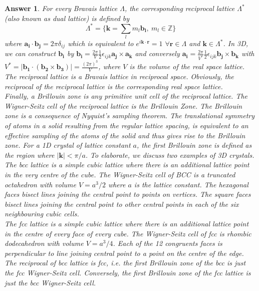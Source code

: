 \documentclass[a4paper]{article}
\newtheorem{ans}{Answer}[subsection]
\theoremstyle{new}
\begin{document}
\begin{ans}
For every Bravais lattice $\Lambda$, the  corresponding reciprocal lattice $\Lambda^*$ (also known as dual lattice) is defined by
$$\Lambda^*=\bigg\{\mathbf{k}=\sum_lm_l\mathbf{b_l},~m_l\in\mathbb{Z}\bigg\}$$
where $\mathbf{a_i}\cdot\mathbf{b_j}=2\pi\delta_{ij}$ which is equivalent to $e^{i\mathbf{k}\cdot\mathbf{r}}=1$ $\forall\mathbf{r}\in\Lambda$ and $\mathbf{k}\in\Lambda^*$. In 3D, we can construct $\mathbf{b_i}$ by $\mathbf{b_i}=\frac{2\pi}{V}\frac{1}{2}\epsilon_{ijk}\mathbf{a_j}\times\mathbf{a_k}$ and conversely $\mathbf{a_i}=\frac{2\pi}{V^*}\frac{1}{2}\epsilon_{ijk}\mathbf{b_j}\times\mathbf{b_k}$ with $V^*=|\mathbf{b_1}\cdot(\mathbf{b_2}\times\mathbf{b_3})|=\frac{(2\pi)^3}{V}$, where $V$ is the volume of the real space lattice. The reciprocal lattice is a Bravais lattice in reciprocal space. Obviously, the reciprocal of the reciprocal lattice is the corresponding real space lattice.\\[5pt]
Finally, a Brillouin zone is any primitive unit cell of the reciprocal lattice. The Wigner-Seitz cell of the reciprocal lattice is the Brillouin Zone. The Brillouin zone is a consequence  of Nyquist's sampling theorem. The translational symmetry of atoms in a solid resulting from the regular lattice spacing, is equivalent to an effective sampling of the atoms of the solid and thus gives rise to the Brillouin zone. For a 1D crystal of lattice constant $a$, the first Brillouin zone is defined as the region where $|\mathbf{k}|<\pi/a$. To elaborate, we discuss two examples of 3D crystals.\\[5pt]
The bcc lattice is a simple cubic lattice where there is an additional lattice point in the very centre of the cube. The Wigner-Seitz cell of BCC is a truncated octahedron with volume $V=a^3/2$ where $a$ is the lattice constant. The hexagonal faces bisect lines joining the central point to points on vertices. The square faces bisect lines joining the central point to other central points in each of the six neighbouring cubic cells.\\[5pt]
The fcc lattice is a simple cubic lattice where there is an additional lattice point in the centre of every face of every cube. The Wigner-Seitz cell of fcc is rhombic dodecahedron with volume $V=a^3/4$. Each of the 12 congruents faces is perpendicular to line joining central point to a point on the centre of the edge.\\[5pt]
The reciprocal of bcc lattice is fcc, i.e. the first Brillouin zone of the bcc is just the fcc Wigner-Seitz cell. Conversely, the first Brillouin zone of the fcc lattice is just the bcc Wigner-Seitz cell.
\end{ans}
\newpage
\end{document}

